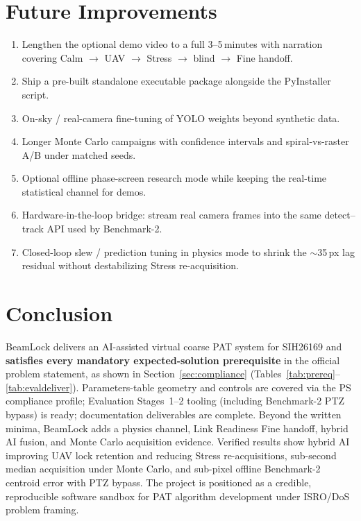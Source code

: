 \documentclass[11pt,a4paper]{article}
\begin{document}
\section{Future Improvements}

\begin{enumerate}
  \item Lengthen the optional demo video to a full 3--5\,minutes with narration covering Calm $\rightarrow$ UAV $\rightarrow$ Stress $\rightarrow$ blind $\rightarrow$ Fine handoff.
  \item Ship a pre-built standalone executable package alongside the PyInstaller script.
  \item On-sky / real-camera fine-tuning of YOLO weights beyond synthetic data.
  \item Longer Monte Carlo campaigns with confidence intervals and spiral-vs-raster A/B under matched seeds.
  \item Optional offline phase-screen research mode while keeping the real-time statistical channel for demos.
  \item Hardware-in-the-loop bridge: stream real camera frames into the same detect--track API used by Benchmark-2.
  \item Closed-loop slew / prediction tuning in physics mode to shrink the $\sim$35\,px lag residual without destabilizing Stress re-acquisition.
\end{enumerate}

\section{Conclusion}

BeamLock delivers an AI-assisted virtual coarse PAT system for SIH26169 and \textbf{satisfies every mandatory expected-solution prerequisite} in the official problem statement, as shown in Section~\ref{sec:compliance} (Tables~\ref{tab:prereq}--\ref{tab:evaldeliver}).
Parameters-table geometry and controls are covered via the PS compliance profile; Evaluation Stages~1--2 tooling (including Benchmark-2 PTZ bypass) is ready; documentation deliverables are complete.
Beyond the written minima, BeamLock adds a physics channel, Link Readiness Fine handoff, hybrid AI fusion, and Monte Carlo acquisition evidence.
Verified results show hybrid AI improving UAV lock retention and reducing Stress re-acquisitions, sub-second median acquisition under Monte Carlo, and sub-pixel offline Benchmark-2 centroid error with PTZ bypass.
The project is positioned as a credible, reproducible software sandbox for PAT algorithm development under ISRO/DoS problem framing.
\end{document}

